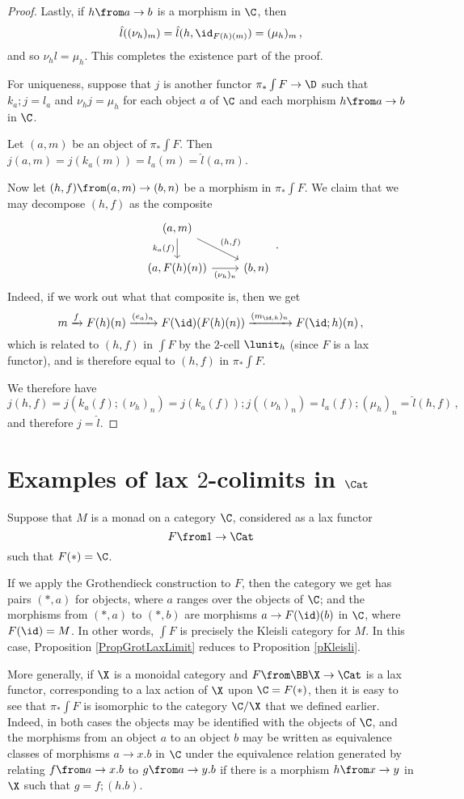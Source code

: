 \begin{proof}
  Lastly, if $h\from a \to b$ is a morphism in $\C$, then 
  \[
    \hat{l}((\nu_h)_m)=\hat{l}(h,\id_{F(h)(m)}) = (\mu_h)_m\,,
    \]
  and so $\nu_hl = \mu_h$.  
  This completes the existence part of the proof.

  For uniqueness, suppose that $j$ is another functor $\pi_*\int F \to \D$ such that $k_a;j=l_a$ and $\nu_hj=\mu_h$ for each object $a$ of $\C$ and each morphism $h\from a \to b$ in $\C$.

  Let $(a,m)$ be an object of $\pi_*\int F$.  
  Then $j(a,m)=j(k_a(m))=l_a(m)=\hat{l}(a,m)$.  

  Now let $(h,f)\from (a,m) \to (b,n)$ be a morphism in $\pi_*\int F$.  
  We claim that we may decompose $(h,f)$ as the composite
  \[
    \begin{tikzcd}
      (a,m) \arrow[d, "k_a(f)"'] \arrow[dr, "{(h,f)}"]
        & \\
      (a,F(h)(n)) \arrow[r, "(\nu_h)_n"']
        & (b,n)
    \end{tikzcd}\,.
    \]
  Indeed, if we work out what that composite is, then we get
  \[
    m \xrightarrow{f}
    F(h)(n) \xrightarrow{(e_a)_n}
    F(\id)(F(h)(n)) \xrightarrow{(m_{\id,h})_n}
    F(\id;h)(n)\,,
    \]
  which is related to $(h,f)$ in $\int F$ by the $2$-cell $\lunit_h$ (since $F$ is a lax functor), and is therefore equal to $(h,f)$ in $\pi_*\int F$.

  We therefore have
  \[
    j(h,f) = j(k_a(f);(\nu_h)_n) = j(k_a(f));j((\nu_h)_n) = l_a(f);(\mu_h)_n = \hat{l}(h, f)\,,
    \]
  and therefore $j=\hat{l}$.  
\end{proof}

\section{Examples of lax $2$-colimits in $\Cat$}

Suppose that $M$ is a monad on a category $\C$, considered as a lax functor
\[
  F\from 1\to \Cat
  \]
such that $F(*)=\C$.

If we apply the Grothendieck construction to $F$, then the category we get has pairs $(*,a)$ for objects, where $a$ ranges over the objects of $\C$; and the morphisms from $(*,a)$ to $(*,b)$ are morphisms $a \to F(\id)(b)$ in $\C$, where $F(\id)=M$.  
In other words, $\int F$ is precisely the Kleisli category for $M$.
In this case, Proposition \ref{PropGrotLaxLimit} reduces to Proposition \ref{pKleisli}.

More generally, if $\X$ is a monoidal category and $F\from \BB \X \to \Cat$ is a lax functor, corresponding to a lax action of $\X$ upon $\C = F(*)$, then it is easy to see that $\pi_*\int F$ is isomorphic to the category $\C/\X$ that we defined earlier.  
Indeed, in both cases the objects may be identified with the objects of $\C$, and the morphisms from an object $a$ to an object $b$ may be written as equivalence classes of morphisms $a \to x.b$ in $\C$ under the equivalence relation generated by relating $f\from a \to x.b$ to $g\from a \to y.b$ if there is a morphism $h\from x \to y$ in $\X$ such that $g=f;(h.b)$.

